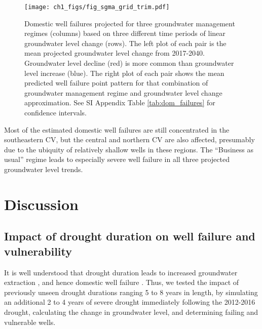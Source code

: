 \begin{figure}
	\texttt{[image: ch1\_figs/fig\_sgma\_grid\_trim.pdf]}
	\caption{Domestic well failures projected for three groundwater management regimes (columns) based on three different time periods of linear groundwater level change (rows). The left plot of each pair is the mean projected groundwater level change from 2017-2040. Groundwater level decline (red) is more common than groundwater level increase (blue). The right plot of each pair shows the mean predicted well failure point pattern for that combination of groundwater management regime and groundwater level change approximation. See SI Appendix Table \ref{tab:dom_failures} for confidence intervals.}
	\label{fig:sgma_grid}
\end{figure}
\clearpage

Most of the estimated domestic well failures are still concentrated in the southeastern CV, but the central and northern CV are also affected, presumably due to the ubiquity of relatively shallow wells in these regions. The ``Business as usual'' regime leads to especially severe well failure in all three projected groundwater level trends.



\section{Discussion}


\subsection{Impact of drought duration on well failure and vulnerability}

It is well understood that drought duration leads to increased groundwater extraction \citep{Hanak2011, Medellin-azuara2016}, and hence domestic well failure \citep{Perrone2017, Feinstein2017}. Thus, we tested the impact of previously unseen drought durations ranging 5 to 8 years in length, by simulating an additional 2 to 4 years of severe drought immediately following the 2012-2016 drought, calculating the change in groundwater level, and determining failing and vulnerable wells. 

